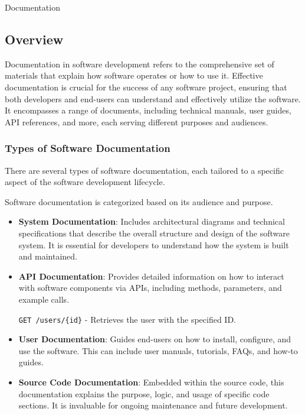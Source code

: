 \begin{notes}{Documentation}
    \subsection*{Overview}

    Documentation in software development refers to the comprehensive set of materials that explain how software operates or how to use it. Effective documentation is crucial for the success of any 
    software project, ensuring that both developers and end-users can understand and effectively utilize the software. It encompasses a range of documents, including technical manuals, user guides, 
    API references, and more, each serving different purposes and audiences.
    
    \subsubsection*{Types of Software Documentation}
    
    There are several types of software documentation, each tailored to a specific aspect of the software development lifecycle.
    
    \begin{highlight}
    
        Software documentation is categorized based on its audience and purpose.
        
        \begin{itemize}
            \item \textbf{System Documentation}: Includes architectural diagrams and technical specifications that describe the overall structure and design of the software system. It is essential 
            for developers to understand how the system is built and maintained.
            \item \textbf{API Documentation}: Provides detailed information on how to interact with software components via APIs, including methods, parameters, and example calls.
            \begin{code}[Example]
            \texttt{GET /users/\{id\}} - Retrieves the user with the specified ID.
            \end{code}
            \item \textbf{User Documentation}: Guides end-users on how to install, configure, and use the software. This can include user manuals, tutorials, FAQs, and how-to guides.
            \item \textbf{Source Code Documentation}: Embedded within the source code, this documentation explains the purpose, logic, and usage of specific code sections. It is invaluable for ongoing 
            maintenance and future development.
        \end{itemize}
    

\end{highlight}
\end{notes}

